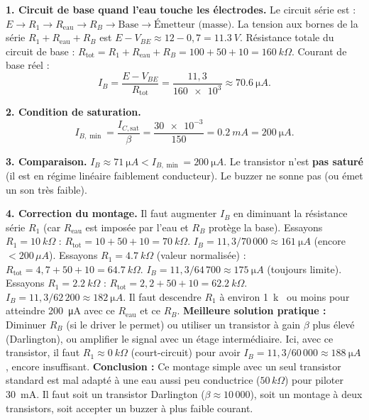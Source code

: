 \documentclass[11pt]{article}
\begin{document}
\begin{corrige}
\textbf{1. Circuit de base quand l'eau touche les électrodes.}
Le circuit série est : $E \rightarrow R_1 \rightarrow R_{\text{eau}} \rightarrow R_B \rightarrow \text{Base} \rightarrow \text{Émetteur (masse)}$.
La tension aux bornes de la série $R_1 + R_{\text{eau}} + R_B$ est $E - V_{BE} \approx 12 - 0,7 = \SI{11,3}{V}$.
Résistance totale du circuit de base : $R_{\text{tot}} = R_1 + R_{\text{eau}} + R_B = 100 + 50 + 10 = \SI{160}{k\Omega}$.
Courant de base réel :
\[ I_B = \frac{E - V_{BE}}{R_{\text{tot}}} = \frac{11{,}3}{\num{160e3}} \approx \SI{70,6}{\micro A}. \]

\textbf{2. Condition de saturation.}
\[ I_{B,\min} = \frac{I_{C,\text{sat}}}{\beta} = \frac{\num{30e-3}}{150} = \SI{0,2}{mA} = \SI{200}{\micro A}. \]

\textbf{3. Comparaison.}
$I_B \approx \SI{71}{\micro A} < I_{B,\min} = \SI{200}{\micro A}$.
Le transistor n'est \textbf{pas saturé} (il est en régime linéaire faiblement conducteur). Le buzzer ne sonne pas (ou émet un son très faible).

\textbf{4. Correction du montage.}
Il faut augmenter $I_B$ en diminuant la résistance série $R_1$ (car $R_{\text{eau}}$ est imposée par l'eau et $R_B$ protège la base).
Essayons $R_1 = \SI{10}{k\Omega}$ : $R_{\text{tot}} = 10 + 50 + 10 = \SI{70}{k\Omega}$.
$I_B = 11{,}3 / 70\,000 \approx \SI{161}{\micro A}$ (encore $< 200\,\mu A$).
Essayons $R_1 = \SI{4,7}{k\Omega}$ (valeur normalisée) : $R_{\text{tot}} = 4,7 + 50 + 10 = \SI{64,7}{k\Omega}$.
$I_B = 11{,}3 / 64\,700 \approx \SI{175}{\micro A}$ (toujours limite).
Essayons $R_1 = \SI{2,2}{k\Omega}$ : $R_{\text{tot}} = 2,2 + 50 + 10 = \SI{62,2}{k\Omega}$.
$I_B = 11{,}3 / 62\,200 \approx \SI{182}{\micro A}$.
Il faut descendre $R_1$ à environ \SI{1}{k\Omega} ou moins pour atteindre \SI{200}{\micro A} avec ce $R_{\text{eau}}$ et ce $R_B$.
\textbf{Meilleure solution pratique :} Diminuer $R_B$ (si le driver le permet) ou utiliser un transistor à gain $\beta$ plus élevé (Darlington), ou amplifier le signal avec un étage intermédiaire. Ici, avec ce transistor, il faut $R_1 \approx \SI{0}{k\Omega}$ (court-circuit) pour avoir $I_B = 11,3 / 60\,000 \approx \SI{188}{\micro A}$, encore insuffisant. \textbf{Conclusion :} Ce montage simple avec un seul transistor standard est mal adapté à une eau aussi peu conductrice ($50\,k\Omega$) pour piloter \SI{30}{mA}. Il faut soit un transistor Darlington ($\beta \approx 10\,000$), soit un montage à deux transistors, soit accepter un buzzer à plus faible courant.
\end{corrige}
\end{document}
